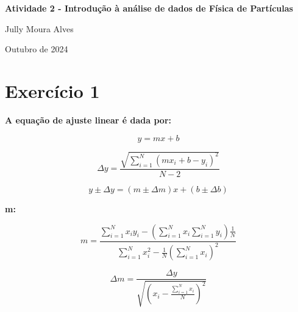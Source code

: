 \documentclass{article}
\begin{document}
    \begin{titlepage}
      \centering
      \vspace*{1cm}
    
     \Huge
     \textbf{Atividade 2 - Introdução à análise de dados de Física de Partículas}

     \vspace{0.5cm}
    
     \Large 
      Jully Moura Alves

     \vfill
    
     \Large
      Outubro de 2024
    \end{titlepage}

    \raggedright{
      \section*{Exercício 1}
      \vspace*{1cm}

 
      \textbf{A equação de ajuste linear é dada por:}
      \vspace{0.5cm}

           {\Large 
              \[ y = mx + b\]
              
              \vspace{0.5cm}
              
              \[\Delta y = \frac {\sqrt {\sum_{i=1}^N (m x_i + b - y_i)^2}}{N-2} \]

              \vspace{0.5cm}
              
              \[ y \pm \Delta y = (m \pm \Delta m) x + (b \pm \Delta b) \]
           }
  
       \vspace{0.5cm}

           \textbf{m:}
           \vspace{0.5cm}
  
           {\Large
              \[ m = \frac{\sum_{i=1}^{N} x_i y_i -({\sum_{i=1}^{N} x_i \sum_{i=1}^{N} y_i})\frac{1}{N}}{ \sum_{i=1}^{N} x_i^2 - \frac{1}{N}{\left( \sum_{i=1}^{N} x_i \right)^2}}\]
              
            \vspace{0.5cm}
  
              \[\Delta m = \frac{\Delta y}{\sqrt{ (x_i - \frac{ \sum_{i=1}^N x_i}{N})^2}}\]
            }
  
        \vspace{0.5cm}
  
}
\end{document}

